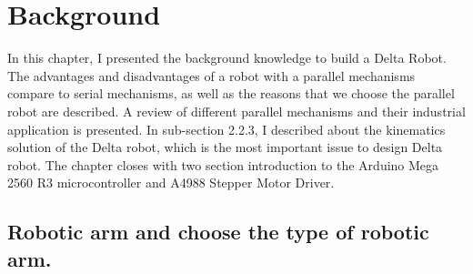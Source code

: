 \makeatletter
\def\maxwidth#1{\ifdim\Gin@nat@width>#1 #1\else\Gin@nat@width\fi}
\makeatother

\chapter{Background}

In this chapter, I presented the background knowledge to build a Delta Robot. The advantages and disadvantages of a robot with a parallel mechanisms compare to serial mechanisms, as well as the reasons that we choose the parallel robot are described. A review of different parallel mechanisms and their industrial application is presented. 
In sub-section 2.2.3, I described about the kinematics solution of the Delta robot, which is the most important issue to design Delta robot.
The chapter closes with two section introduction to the Arduino Mega 2560 R3 microcontroller and A4988 Stepper Motor Driver.

\section{Robotic arm and choose the type of robotic arm.}

